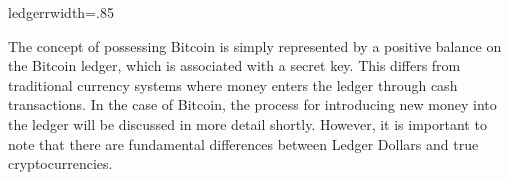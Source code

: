 {ledgerr}{width=.85\textwidth}%

The concept of possessing Bitcoin is simply represented by a positive balance on the Bitcoin ledger, which is associated with a secret key.
This differs from traditional currency systems where money enters the ledger through cash transactions. In the case of Bitcoin, the process
for introducing new money into the ledger will be discussed in more detail shortly. However, it is important to note that there are
fundamental differences between Ledger Dollars and true cryptocurrencies.
